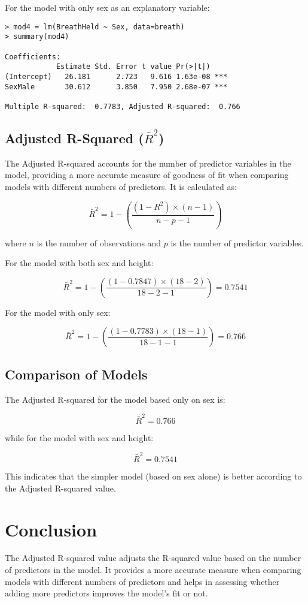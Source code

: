 \documentclass{article}
\begin{document}
For the model with only sex as an explanatory variable:

\begin{verbatim}
> mod4 = lm(BreathHeld ~ Sex, data=breath)
> summary(mod4)

Coefficients:
            Estimate Std. Error t value Pr(>|t|)    
(Intercept)   26.181      2.723   9.616 1.63e-08 ***
SexMale       30.612      3.850   7.950 2.68e-07 ***

Multiple R-squared:  0.7783, Adjusted R-squared:  0.766 
\end{verbatim}

\subsection{Adjusted R-Squared (\(\bar{R}^2\))}

The Adjusted R-squared accounts for the number of predictor variables in the model, providing a more accurate measure of goodness of fit when comparing models with different numbers of predictors. It is calculated as:

\[
\bar{R}^2 = 1 - \left( \frac{(1 - R^2) \times (n - 1)}{n - p - 1} \right)
\]

where \(n\) is the number of observations and \(p\) is the number of predictor variables.

For the model with both sex and height:

\[
\bar{R}^2 = 1 - \left( \frac{(1 - 0.7847) \times (18 - 2)}{18 - 2 - 1} \right) = 0.7541
\]

For the model with only sex:

\[
\bar{R}^2 = 1 - \left( \frac{(1 - 0.7783) \times (18 - 1)}{18 - 1 - 1} \right) = 0.766
\]

\subsection{Comparison of Models}

The Adjusted R-squared for the model based only on sex is:

\[
\bar{R}^2 = 0.766
\]

while for the model with sex and height:

\[
\bar{R}^2 = 0.7541
\]

This indicates that the simpler model (based on sex alone) is better according to the Adjusted R-squared value.

\section{Conclusion}

The Adjusted R-squared value adjusts the R-squared value based on the number of predictors in the model. It provides a more accurate measure when comparing models with different numbers of predictors and helps in assessing whether adding more predictors improves the model's fit or not.
\end{document}
